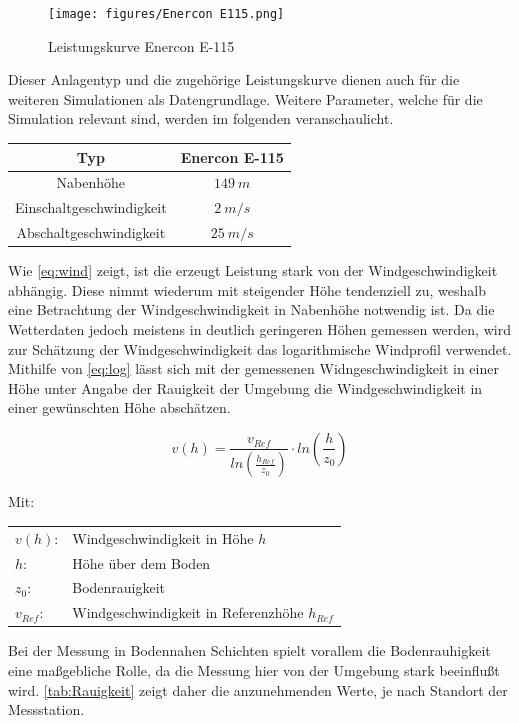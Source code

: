 \begin{figure}[H]
	\centering
	\texttt{[image: figures/Enercon E115.png]}
	\caption{Leistungskurve Enercon E-115 \cite{E115}}
	\label{fig:Leistungskurve}
\end{figure}

Dieser Anlagentyp und die zugehörige Leistungskurve dienen auch für die weiteren Simulationen als Datengrundlage. Weitere Parameter, welche für die Simulation relevant sind, werden im folgenden veranschaulicht.

\begin{center}
	\begin{tabular}[htpb]{c|c}
		Typ & Enercon E-115 \\
		\hline
		Nabenhöhe & $149~m$ \\
		Einschaltgeschwindigkeit & $2~m/s$ \\
		Abschaltgeschwindigkeit & $25~m/s$
	\end{tabular}
\end{center}

Wie \autoref{eq:wind} zeigt, ist die erzeugt Leistung stark von der Windgeschwindigkeit abhängig. Diese nimmt wiederum mit steigender Höhe tendenziell zu, weshalb eine Betrachtung der Windgeschwindigkeit in Nabenhöhe notwendig ist. Da die Wetterdaten jedoch meistens in deutlich geringeren Höhen gemessen werden, wird zur Schätzung der Windgeschwindigkeit das logarithmische Windprofil verwendet. Mithilfe von \autoref{eq:log} lässt sich mit der gemessenen Widngeschwindigkeit in einer Höhe unter Angabe der Rauigkeit der Umgebung die Windgeschwindigkeit in einer gewünschten Höhe abschätzen. \cite{Hoehenprofil}

\begin{equation}
	v(h) = \frac{v_{Ref}}{ln\left(\frac{h_{Ref}}{z_0}\right)} \cdot ln\left(\frac{h}{z_0}\right)
	\label{eq:log}
\end{equation}

Mit:

\begin{flushleft}
	\begin{tabular}[htpb]{ll}
		$v(h)$: & Windgeschwindigkeit in Höhe $h$ \\
		$h$: & Höhe über dem Boden \\
		$z_0$: & Bodenrauigkeit \\
		$v_{Ref}$: & Windgeschwindigkeit in Referenzhöhe $h_{Ref}$ 
	\end{tabular}
\end{flushleft}

Bei der Messung in Bodennahen Schichten spielt vorallem die Bodenrauhigkeit eine maßgebliche Rolle, da die Messung hier von der Umgebung stark beeinflußt wird. \autoref{tab:Rauigkeit} zeigt daher die anzunehmenden Werte, je nach Standort der Messstation.  

